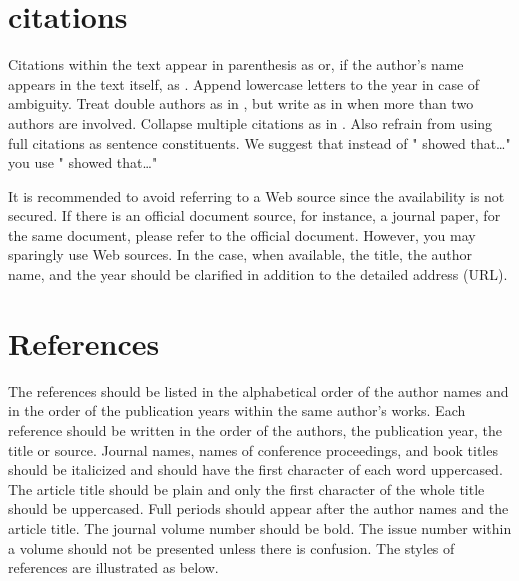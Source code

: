 \documentclass{ICLSarticle}
\begin{document}
\section*{citations}
Citations within the text appear in parenthesis as \parencite{linton_disability_1998} or, if the author’s name appears in the text itself, as \textcite{linton_disability_1998}. Append lowercase letters to the year in case of ambiguity. Treat double authors as in \parencite{sengupta-irving_conceptualizing_2017}, but write as in \parencite{decuyper_grasping_2010} when more than two authors are involved. Collapse multiple citations as in \parencite{linton_disability_1998, sengupta-irving_conceptualizing_2017}. Also refrain from using full citations as sentence constituents. We suggest that instead of
"\parencite{linton_disability_1998} showed that\ldots"
you use
"\textcite{linton_disability_1998} showed that\ldots"


It is recommended to avoid referring to a Web source since the availability is not secured. If there is an official document source, for instance, a journal paper, for the same document, please refer to the official document. However, you may sparingly use Web sources. In the case, when available, the title, the author name, and the year should be clarified in addition to the detailed address (URL). 

\section*{References}
The references should be listed in the alphabetical order of the author names and in the order of the publication years within the same author’s works. Each reference should be written in the order of the authors, the publication year, the title or source. Journal names, names of conference proceedings, and book titles should be italicized and should have the first character of each word uppercased. The article title should be plain and only the first character of the whole title should be uppercased. Full periods should appear after the author names and the article title. The journal volume number should be bold. The issue number within a volume should not be presented unless there is confusion. The styles of references are illustrated as below.



\printbibliography[heading=bibintoc]
\end{document}
